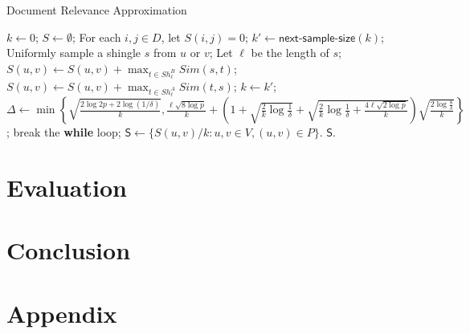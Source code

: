 \documentclass{article}
\begin{document}
\begin{algorithm}[!t]
\caption{\textsf{Document Relevance Approximation}}
\label{alg:csa}
\renewcommand{\algorithmicrequire}{\textbf{Input:}}
\renewcommand{\algorithmicensure}{\textbf{Output:}}
\begin{algorithmic}
\State $k \gets 0$; $S \gets \emptyset$;
\State For each $i,j \in D$, let $S(i,j) = 0$;
	\State $k' \gets \textsf{next-sample-size}(k)$;
		  \State Uniformly sample a shingle $s$ from $u$ or $v$;
			\State Let $\ell$ be the length of $s$;
  			\State $S(u,v) \gets S(u,v) + \max_{t\in Sh_\ell^B}Sim(s, t)$;
			\Else
			  \State $S(u,v) \gets S(u,v) + \max_{t\in Sh_\ell^A}Sim(t, s)$;
			\EndIf
		\EndFor
	\EndFor
	\State $k \gets k'$;
	\State $\Delta \gets \min\left\{\sqrt{\frac{2\log 2p + 2\log(1/\delta)}{k}}, \frac{\ell\sqrt{8\log p}}{k} +\left(1+\sqrt{\frac{2}{k}\log \frac{1}{\delta}} + \sqrt{\frac{2}{k}\log \frac{1}{\delta} + \frac{4\ell\sqrt{2\log p}}{k}}\right)\sqrt{\frac{2\log \frac{8}{\delta}}{k}}\right\}$;
	\If {$\Delta \leq \epsilon$}
		\State break the {\bf while} loop;
	\EndIf
\EndWhile
\State $\mathsf{S} \gets \{S(u,v)/k : u,v\in V, (u,v)\in P\}$.
 $\mathsf{S}$.
\end{algorithmic}
\end{algorithm}

\section{Evaluation}
\label{sec:eval}


\section{Conclusion}
\label{sec:con}


%



\section{Appendix}

\end{document}
